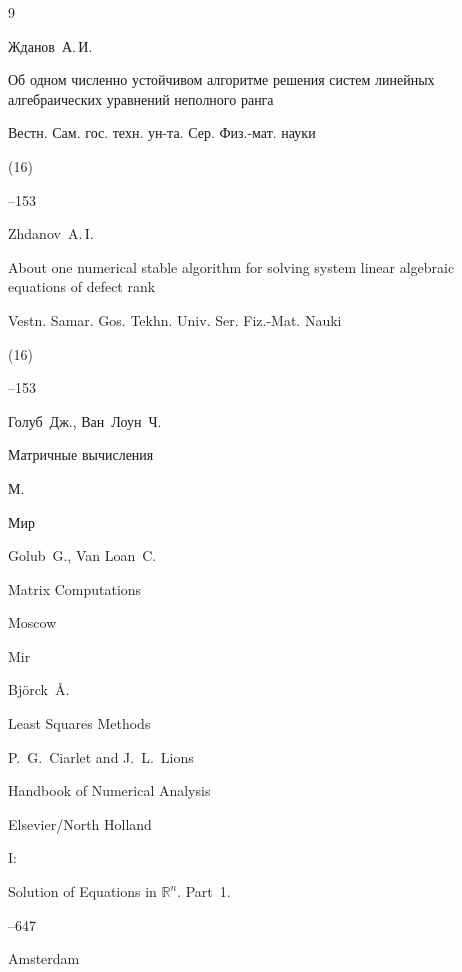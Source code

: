 \begin{thebibliography}{9}

\by Жданов~А.\,И. 

\paper Об одном численно устойчивом алгоритме решения систем линейных алгебраических уравнений неполного ранга

\jour Вестн. Сам. гос. техн. ун-та. Сер. Физ.-мат. науки


(16)

--153

\misctransl

\by Zhdanov~A.\,I.

\paper About one numerical stable algorithm for solving system linear algebraic equations of defect rank

\jour Vestn. Samar. Gos. Tekhn. Univ. Ser. Fiz.-Mat. Nauki


(16)

--153




\by Голуб~Дж., Ван~Лоун~Ч. 

\book Матричные вычисления 

\publaddr М. 

\publ Мир 



\misctransl

\by Golub~G., Van Loan~C.

\book Matrix Computations 

\publaddr Moscow

\publ Mir








\by  Bj{\"o}rck~{\AA}. 

\paper Least Squares Methods


\eds P.~G.~Ciarlet and J.~L.~Lions

\inbook Handbook of Numerical Analysis

\publ Elsevier/North Holland

\bookvol I\nofrills:

\volinfo Solution of Equations in $\mathbb R^n$. Part~1.

--647

\publaddr Amsterdam







\end{thebibliography}



